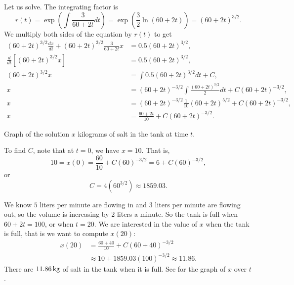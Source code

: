 \begin{example}
Let us solve.  The integrating factor is
\begin{equation*}
r(t) = \exp \left( \int \frac{3}{60+2t} dt  \right)
=
\exp \left( \frac{3}{2} \ln (60+2t) \right)
=
{(60+2t)}^{3/2} .
\end{equation*}
We multiply both sides of the equation by $r(t)$ to get
\begin{align*}
{(60+2t)}^{3/2} \frac{dx}{dt} +
{(60+2t)}^{3/2} \frac{3}{60+2t} x
& =
0.5{(60+2t)}^{3/2} ,\\
\frac{d}{dt}\left[
{(60+2t)}^{3/2} x \right]
& =
0.5{(60+2t)}^{3/2} ,\\
{(60+2t)}^{3/2} x
& =
\int 
0.5{(60+2t)}^{3/2}
dt
+C ,\\
 x
& =
{(60+2t)}^{-3/2} \int 
\frac{
{(60+2t)}^{3/2}
}{2}
dt
+C{(60+2t)}^{-3/2} ,\\
 x
& =
{(60+2t)}^{-3/2}
\frac{1}{10}{(60+2t)}^{5/2}
+C{(60+2t)}^{-3/2} ,\\
 x
& =
\frac{60+2t}{10}
+C{(60+2t)}^{-3/2} .
\end{align*}

\begin{mywrapfig}{3.25in}
\capstart
{}
\caption{Graph of the solution $x$ kilograms of salt in the tank at time
$t$.\label{linear-salt-graph:fig}}
\end{mywrapfig}
%
%
To find $C$, note that at $t=0$, we have $x=10$.  That is,
\begin{equation*}
10 = x(0)
=
\frac{60}{10}
+C{(60)}^{-3/2}
=
6
+C{(60)}^{-3/2} ,
\end{equation*}
or
\begin{equation*}
C=4 ({60}^{3/2}) \approx 1859.03 .
\end{equation*}

We know $5$ liters per minute are flowing in and $3$ liters per minute are flowing out,
so the volume is increasing by $2$ liters a minute.
So the tank is
full when $60+2t = 100$, or when $t=20$.
We are interested in the value of $x$ when the tank is full,
that is we want to compute $x(20)$:
\begin{equation*}
\begin{split}
x(20) & = 
\frac{60+40}{10}
+C{(60+40)}^{-3/2}
\\
& \approx
10
+1859.03 {(100)}^{-3/2}
\approx
11.86 .
\end{split}
\end{equation*}
There are $\unit[11.86]{kg}$ of salt in the tank when it is full.
See  for the graph of $x$ over $t$.


\end{example}
